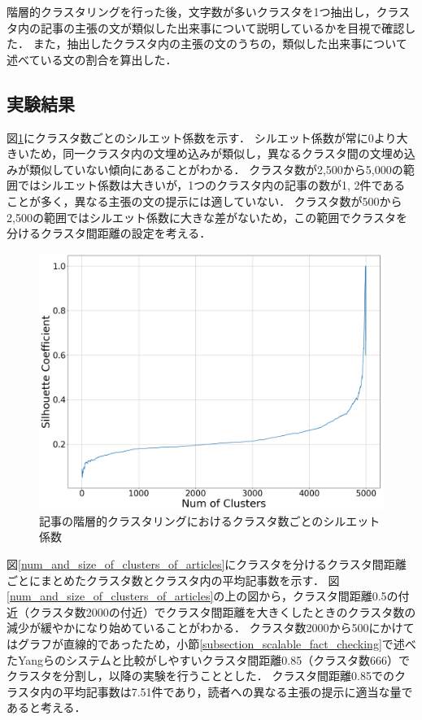 \documentclass[12pt,a4j]{jreport}
\begin{document}
階層的クラスタリングを行った後，文字数が多いクラスタを1つ抽出し，クラスタ内の記事の主張の文が類似した出来事について説明しているかを目視で確認した．
また，抽出したクラスタ内の主張の文のうちの，類似した出来事について述べている文の割合を算出した．

\subsection{実験結果}
図\ref{articles_silhouette}にクラスタ数ごとのシルエット係数を示す．
シルエット係数が常に0より大きいため，同一クラスタ内の文埋め込みが類似し，異なるクラスタ間の文埋め込みが類似していない傾向にあることがわかる．
クラスタ数が2,500から5,000の範囲ではシルエット係数は大きいが，1つのクラスタ内の記事の数が1, 2件であることが多く，異なる主張の文の提示には適していない．
クラスタ数が500から2,500の範囲ではシルエット係数に大きな差がないため，この範囲でクラスタを分けるクラスタ間距離の設定を考える．

\begin{figure}[H]
	\centering
	\includegraphics[keepaspectratio, width=120mm]{img/process-06_articles-cluster_num-of-clusters-dependency-on-silhouette-coefficient_with-maximal-silhoette_reduced-data-to-5000_Trim.png}
	\caption{記事の階層的クラスタリングにおけるクラスタ数ごとのシルエット係数}
	\label{articles_silhouette}
\end{figure}

図\ref{num_and_size_of_clusters_of_articles}にクラスタを分けるクラスタ間距離ごとにまとめたクラスタ数とクラスタ内の平均記事数を示す．
図\ref{num_and_size_of_clusters_of_articles}の上の図から，クラスタ間距離0.5の付近（クラスタ数2000の付近）でクラスタ間距離を大きくしたときのクラスタ数の減少が緩やかになり始めていることがわかる．
クラスタ数2000から500にかけてはグラフが直線的であったため，小節\ref{subsection_scalable_fact_checking}で述べたYangらのシステムと比較がしやすいクラスタ間距離0.85（クラスタ数666）でクラスタを分割し，以降の実験を行うこととした\cite{yang_scalable_2021}．
クラスタ間距離0.85でのクラスタ内の平均記事数は7.51件であり，読者への異なる主張の提示に適当な量であると考える．
\end{document}
